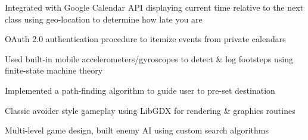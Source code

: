 ﻿\documentclass[letterpaper]{deedy-resume} %
\begin{document}
\begin{minipage}[t]{0.66\textwidth}
        \begin{tightitemize}
                \item Integrated with Google Calendar API displaying current time relative to the next class using geo-location to determine how late you are
                \item OAuth 2.0 authentication procedure to itemize events from private calendars
        \end{tightitemize}

        \sectionspace %



        \begin{tightitemize}
                \item Used built-in mobile accelerometers/gyroscopes to detect \& log footsteps using finite-state machine theory
                \item Implemented a path-finding algorithm to guide user to pre-set destination 
        \end{tightitemize}

        \sectionspace %



        \begin{tightitemize}
                \item Classic avoider style gameplay using LibGDX for rendering \& graphics routines
                \item Multi-level game design, built enemy AI using custom search algorithms
        \end{tightitemize}


\end{minipage}
\end{document}
